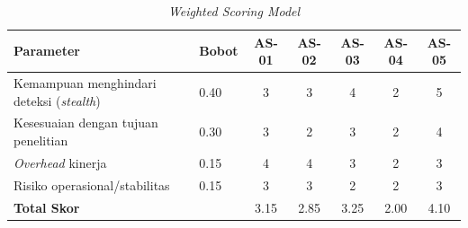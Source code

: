 \begin{table}[H]
\captionsetup{justification=raggedright,singlelinecheck=false}
\centering
\caption{\textit{Weighted Scoring Model}}
\begin{tabular}{|p{4cm}|p{1.5cm}|c|c|c|c|c|}
\hline
\textbf{Parameter} & \textbf{Bobot} & \textbf{AS-01} & \textbf{AS-02} &
\textbf{AS-03} & \textbf{AS-04} & \textbf{AS-05} \\
\hline
Kemampuan menghindari deteksi (\textit{stealth}) & 0.40 & 3 & 3 & 4 & 2 & 5 \\
\hline
Kesesuaian dengan tujuan penelitian & 0.30 & 3 & 2 & 3 & 2 & 4 \\
\hline
\textit{Overhead} kinerja & 0.15 & 4 & 4 & 3 & 2 & 3 \\
\hline
Risiko operasional/stabilitas & 0.15 & 3 & 3 & 2 & 2 & 3 \\
\hline
\textbf{Total Skor} &  & 3.15 & 2.85 & 3.25 & 2.00 & 4.10 \\
\hline
\end{tabular}
\end{table}